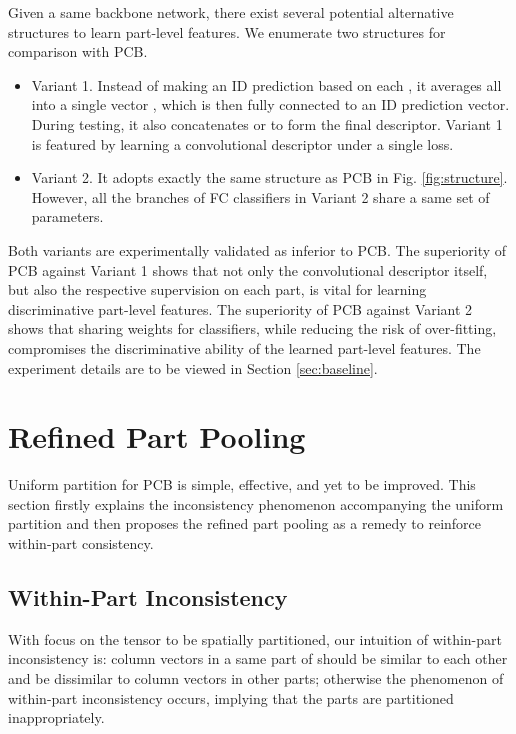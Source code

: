 \documentclass[10pt,twocolumn,letterpaper]{article}
\begin{document}
{{{Given a same backbone network, there exist several potential alternative structures to learn part-level features. We enumerate two structures for comparison with PCB. 

\begin{itemize}
    \item Variant 1. Instead of making an ID prediction based on each  , it averages all  into a single vector \bm{}, which is then fully connected to an ID prediction vector. During testing, it also concatenates  or  to form the final descriptor. Variant 1 is featured by learning a convolutional descriptor under a single loss.
    \item Variant 2. It adopts exactly the same structure as PCB in Fig. \ref{fig:structure}. However, all the branches of FC classifiers in Variant 2 share a same set of parameters.
\end{itemize}

Both variants are experimentally validated as inferior to PCB. The superiority of PCB against Variant 1 shows that not only the convolutional descriptor itself, but also the respective supervision on each part, is vital for learning discriminative part-level features. The superiority of PCB against Variant 2 shows that sharing weights for classifiers, while reducing the risk of over-fitting, compromises the discriminative ability of the learned part-level features. The experiment details are to be viewed in Section \ref{sec:baseline}. 

\section{Refined Part Pooling}\label{sec:pooling}

Uniform partition for PCB is simple, effective, and yet to be improved. This section firstly explains the inconsistency phenomenon accompanying the uniform partition and then proposes the refined part pooling as a remedy to reinforce within-part consistency.

\subsection{Within-Part Inconsistency}\label{sec:inconsistency}
With focus on the tensor  to be spatially partitioned, our intuition of within-part inconsistency is: column vectors  in a same part of  should be similar to each other and be dissimilar to column vectors in other parts; otherwise the phenomenon of within-part inconsistency occurs, implying that the parts are partitioned inappropriately. 


}}}
\end{document}
